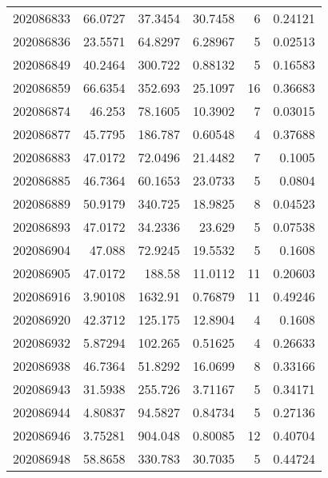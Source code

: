 \begin{tabular}{rrrrrr}
 202086833 &         66.0727  &       37.3454 &           30.7458  &           6 & 0.24121 \\
 202086836 &         23.5571  &       64.8297 &            6.28967 &           5 & 0.02513 \\
 202086849 &         40.2464  &      300.722  &            0.88132 &           5 & 0.16583 \\
 202086859 &         66.6354  &      352.693  &           25.1097  &          16 & 0.36683 \\
 202086874 &         46.253   &       78.1605 &           10.3902  &           7 & 0.03015 \\
 202086877 &         45.7795  &      186.787  &            0.60548 &           4 & 0.37688 \\
 202086883 &         47.0172  &       72.0496 &           21.4482  &           7 & 0.1005  \\
 202086885 &         46.7364  &       60.1653 &           23.0733  &           5 & 0.0804  \\
 202086889 &         50.9179  &      340.725  &           18.9825  &           8 & 0.04523 \\
 202086893 &         47.0172  &       34.2336 &           23.629   &           5 & 0.07538 \\
 202086904 &         47.088   &       72.9245 &           19.5532  &           5 & 0.1608  \\
 202086905 &         47.0172  &      188.58   &           11.0112  &          11 & 0.20603 \\
 202086916 &          3.90108 &     1632.91   &            0.76879 &          11 & 0.49246 \\
 202086920 &         42.3712  &      125.175  &           12.8904  &           4 & 0.1608  \\
 202086932 &          5.87294 &      102.265  &            0.51625 &           4 & 0.26633 \\
 202086938 &         46.7364  &       51.8292 &           16.0699  &           8 & 0.33166 \\
 202086943 &         31.5938  &      255.726  &            3.71167 &           5 & 0.34171 \\
 202086944 &          4.80837 &       94.5827 &            0.84734 &           5 & 0.27136 \\
 202086946 &          3.75281 &      904.048  &            0.80085 &          12 & 0.40704 \\
 202086948 &         58.8658  &      330.783  &           30.7035  &           5 & 0.44724 \\

\end{tabular}
